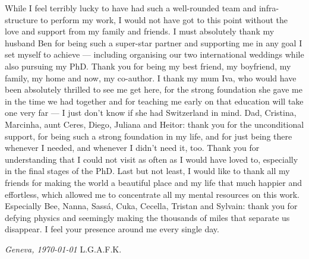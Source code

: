 While I feel terribly lucky to have had such a well-rounded team and infra-structure to perform my work, I would not have got to this point without the love and support from my family and friends. I must absolutely thank my husband Ben for being such a super-star partner and supporting me in any goal I set myself to achieve --- including organising our two international weddings while also pursuing my PhD. Thank you for being my best friend, my boyfriend, my family, my home and now, my co-author. I thank my mum Iva, who would have been absolutely thrilled to see me get here, for the strong foundation she gave me in the time we had together and for teaching me early on that education will take one very far --- I just don't know if she had Switzerland in mind. Dad, Cristina, Marcinha, aunt Ceres, Diego, Juliana and Heitor: thank you for the unconditional support, for being such a strong foundation in my life, and for just being there whenever I needed, and whenever I didn't need it, too. Thank you for understanding that I could not visit as often as I would have loved to, especially in the final stages of the PhD. Last but not least, I would like to thank all my friends for making the world a beautiful place and my life that much happier and effortless, which allowed me to concentrate all my mental resources on this work. Especially Bee, Nanna, Sassá, Cuka, Cecella, Tristan and Sylvain: thank you for defying physics and seemingly making the thousands of miles that separate us disappear. I feel your presence around me every single day.




 
\noindent\textit{Geneva, \today}
\hfill L.G.A.F.K.
